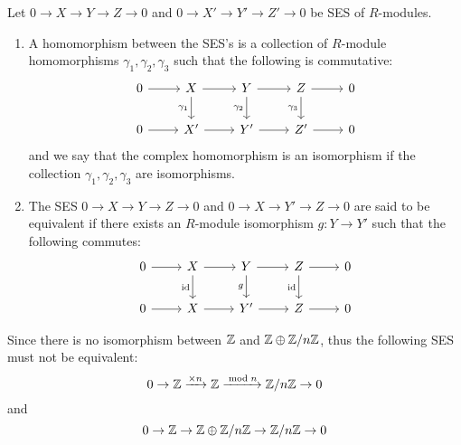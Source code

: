 \begin{defn} 
    Let $0\to X\to Y\to Z\to 0$ and $0\to X'\to Y'\to Z'\to 0$ be SES of $R$-modules. 
    \begin{enumerate}
        \item A homomorphism between the SES's is a collection of $R$-module homomorphisms $\gamma_1, \gamma_2, \gamma_3$ such that the following is commutative:
        \[\begin{tikzcd}[sep=small]
	0 && X && Y && Z && 0 \\
	\\
	0 && {X'} && {Y'} && {Z'} && 0
	\arrow[from=1-1, to=1-3]
	\arrow[from=1-3, to=1-5]
	\arrow["{\gamma_1}"', from=1-3, to=3-3]
	\arrow[from=1-5, to=1-7]
	\arrow["{\gamma_2}"', from=1-5, to=3-5]
	\arrow[from=1-7, to=1-9]
	\arrow["{\gamma_3}"', from=1-7, to=3-7]
	\arrow[from=3-1, to=3-3]
	\arrow[from=3-3, to=3-5]
	\arrow[from=3-5, to=3-7]
	\arrow[from=3-7, to=3-9]
\end{tikzcd}\]
    and we say that the complex homomorphism is an isomorphism if the collection $\gamma_1, \gamma_2, \gamma_3$ are isomorphisms.
    \item The SES $0\to X\to Y\to Z\to 0$ and $0\to X\to Y'\to Z\to 0$ are said to be equivalent if there exists an $R$-module isomorphism $g:Y\to Y'$ such that the following commutes:
    \[\begin{tikzcd}[sep=small]
	0 && X && Y && Z && 0 \\
	\\
	0 && X && {Y'} && Z && 0
	\arrow[from=1-1, to=1-3]
	\arrow[from=1-3, to=1-5]
	\arrow["\id"', from=1-3, to=3-3]
	\arrow[from=1-5, to=1-7]
	\arrow["g"', from=1-5, to=3-5]
	\arrow[from=1-7, to=1-9]
	\arrow["\id"', from=1-7, to=3-7]
	\arrow[from=3-1, to=3-3]
	\arrow[from=3-3, to=3-5]
	\arrow[from=3-5, to=3-7]
	\arrow[from=3-7, to=3-9]
\end{tikzcd}\]
    \end{enumerate}
\end{defn}

\begin{ex}
    Since there is no isomorphism between ${\mathbb Z}$ and ${\mathbb Z}\oplus {\mathbb Z}/n{\mathbb Z}$, thus the following SES must not be equivalent:
    \[0\to {\mathbb Z} \xrightarrow{\times n}{\mathbb Z}\xrightarrow{\bmod n}{\mathbb Z}/n{\mathbb Z} \to 0 \]
    and 
    \[0\to {\mathbb Z}\to {\mathbb Z}\oplus {\mathbb Z}/n{\mathbb Z}\to {\mathbb Z}/n{\mathbb Z} \to 0\]
\end{ex}

